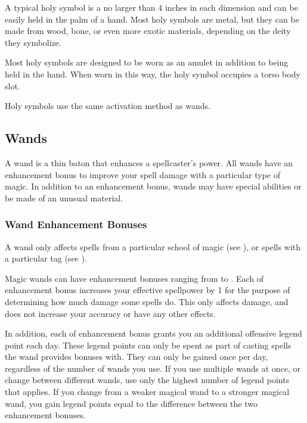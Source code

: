          A typical holy symbol is a no larger than 4 inches in each dimension and can be easily held in the palm of a hand.
        Most holy symbols are metal, but they can be made from wood, bone, or even more exotic materials, depending on the deity they symbolize.

        Most holy symbols are designed to be worn as an amulet in addition to being held in the hand.
        When worn in this way, the holy symbol occupies a torso body slot.

         Holy symbols use the same activation method as wands.

    \subsection{Wands}

        A wand is a thin baton that enhances a spellcaster's power.
        All wands have an enhancement bonus to improve your spell damage with a particular type of magic.
        In addition to an enhancement bonus, wands may have special abilities or be made of an unusual material.

        \subsubsection{Wand Enhancement Bonuses}\label{Wand Enhancement Bonuses}

            A wand only affects spells from a particular school of magic (see ), or spells with a particular tag (see ).

            Magic wands can have enhancement bonuses ranging from  to .
            Each  of enhancement bonus increases your effective spellpower by 1 for the purpose of determining how much damage some spells do.
            This only affects damage, and does not increase your accuracy or have any other effects.

            In addition, each  of enhancement bonus grants you an additional offensive legend point each day.
            These legend points can only be spent as part of casting spells the wand provides bonuses with.
            They can only be gained once per day, regardless of the number of wands you use.
            If you use multiple wands at once, or change between different wands, use only the highest number of legend points that applies.
            If you change from a weaker magical wand to a stronger magical wand, you gain legend points equal to the difference between the two enhancement bonuses.

